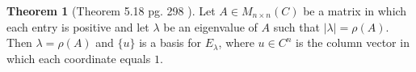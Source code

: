 \documentclass{amsart}
\theoremstyle{definition}
\newtheorem{theorem}{Theorem}
\theoremstyle{remark}
\newtheorem{remark}[thm]{Remark}
\numberwithin{equation}{section}
\begin{document}
\begin{comment}

Suppose $V$ is an inner product space.
Show $|| x + y|| = || x|| + ||y||$ if and only if $x$ is a non-negative multiple of $y$.

$\rightarrow$ Suppose $x = cy$
Then $$|| x  + y|| = ||cx + y|| = || (c +1) y|| = |c + 1| ||y|| = (c + 1) ||y|| =  |c| ||y|| + ||y|| = ||cy || + ||y|| = ||x|| + ||y||$$


$\leftarrow$ We know by the proof of the triangle inequality (Theorem 6.2 (d) \cite{friedberg2003linear}) that $||x+y||^2 = (||x|| + ||y||)^2$ only when 
$$Re(\langle x, y \rangle) = |\langle x, y \rangle| = ||x|| * ||y||$$
where $Re(x)$ is the real part of a complex number $x$.

But this only holds if $x = cy$ for some nonnegative $c$.


\end{proof}

\begin{remark}
Then $\forall n \in \mathbb{N}$, consider $||\sum_{i=1}^n x_i||$.
Then by the previous lemma $x_n = c_n* \sum_{i = 1}^{n-1} x_i$ if and only if

$$||\sum_{i = 1}^n x_i|| = ||\sum_{i = 1}^{n-1} x_i|| + ||x_n||$$.

Then we can repeat to get $x_{n-1} = c_{n-1}  * \sum_{i = 1}^{n-2} x_i$ if and only if $$ ||\sum_{i = 1}^{n-1} x_i|| =  ||\sum_{i = 1}^{n-2} x_i|| + ||x_{n-1}||  $$

And so on until we get $x_2 =\ c_2x_1 , x_3 =\ c_3x_1 \ldots x_n =\ c_nx_1\ $ if and only if  $$||\sum_{i = 1}^n x_i|| = \sum_{i = 1}^{n} ||x_i||$$ 

for non-negative scalars $c_1, c_2, \ldots c_n$.

\end{comment}


\begin{theorem}[Theorem 5.18 pg. 298 \cite{friedberg2003linear}]\label{theorem518}
Let $A \in M_{n \times n} (C)$ be a matrix in which each entry is positive and let $\lambda$ be an eigenvalue of $A$ such that $| \lambda | = \rho(A)$.
Then $\lambda = \rho(A)$ and $\{ u \}$ is a basis for $E_{\lambda}$, where $u \in C^n$ is the column vector in which each coordinate equals $1$.

\end{theorem}
\end{document}

